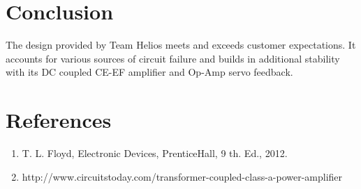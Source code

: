 \documentclass[journal]{IEEEtran}
\begin{document}
\section{Conclusion}

The design provided by Team Helios meets and exceeds customer expectations. It accounts for various 
sources of circuit failure and builds in additional stability with its DC coupled CE-EF amplifier and
Op-Amp servo feedback.

\section{References}

\begin{enumerate}
\item
T. L. Floyd, Electronic Devices, PrenticeHall, 9 th. Ed., 2012.
\item
http://www.circuitstoday.com/transformer-coupled-class-a-power-amplifier
\end{enumerate}
\end{document}
